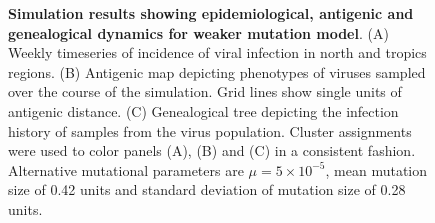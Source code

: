 \begin{figure}[!c]
	\centering
	\caption{\textbf{Simulation results showing epidemiological, antigenic and genealogical dynamics for weaker mutation model}. (A) Weekly timeseries of incidence of viral infection in north and tropics regions. (B) Antigenic map depicting phenotypes of viruses sampled over the course of the simulation.  Grid lines show single units of antigenic distance. (C) Genealogical tree depicting the infection history of samples from the virus population.  Cluster assignments were used to color panels (A), (B) and (C) in a consistent fashion.  Alternative mutational parameters are $\mu = 5 \times 10^{-5}$, mean mutation size of 0.42 units and standard deviation of mutation size of 0.28 units.}
	\label{h1n1_mut}
\end{figure}

\pagebreak

